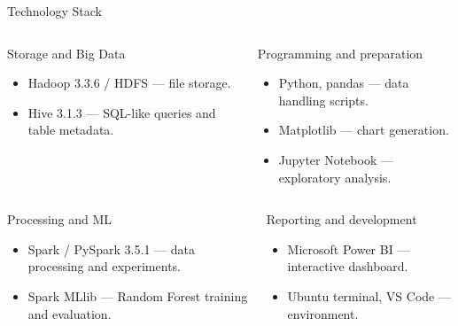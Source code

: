 \documentclass[aspectratio=169,11pt]{beamer}
\begin{document}
\begin{frame}[t]{Technology Stack}
\footnotesize
\vspace{2mm}

\begin{columns}[T,onlytextwidth]
\begin{block}{Storage and Big Data}
\begin{minipage}[t][1.75cm][t]{\linewidth}
\begin{itemize}\itemsep0pt
\item Hadoop 3.3.6 / HDFS --- file storage.
\item Hive 3.1.3 --- SQL-like queries and table metadata.
\end{itemize}
\end{minipage}
\end{block}
\hspace{.04\textwidth}
\begin{block}{Programming and preparation}
\begin{minipage}[t][1.75cm][t]{\linewidth}
\begin{itemize}\itemsep0pt
\item Python, pandas --- data handling scripts.
\item Matplotlib --- chart generation.
\item Jupyter Notebook --- exploratory analysis.
\end{itemize}
\end{minipage}
\end{block}
\end{columns}

\vspace{4mm}

\begin{columns}[T,onlytextwidth]
\begin{block}{Processing and ML}
\begin{minipage}[t][1.75cm][t]{\linewidth}
\begin{itemize}\itemsep0pt
\item Spark / PySpark 3.5.1 --- data processing and experiments.
\item Spark MLlib --- Random Forest training and evaluation.
\end{itemize}
\end{minipage}
\end{block}
\hspace{.04\textwidth}
\begin{block}{Reporting and development}
\begin{minipage}[t][1.75cm][t]{\linewidth}
\begin{itemize}\itemsep0pt
\item Microsoft Power BI --- interactive dashboard.
\item Ubuntu terminal, VS Code --- environment.
\end{itemize}
\end{minipage}
\end{block}
\end{columns}


\end{frame}
\end{document}
